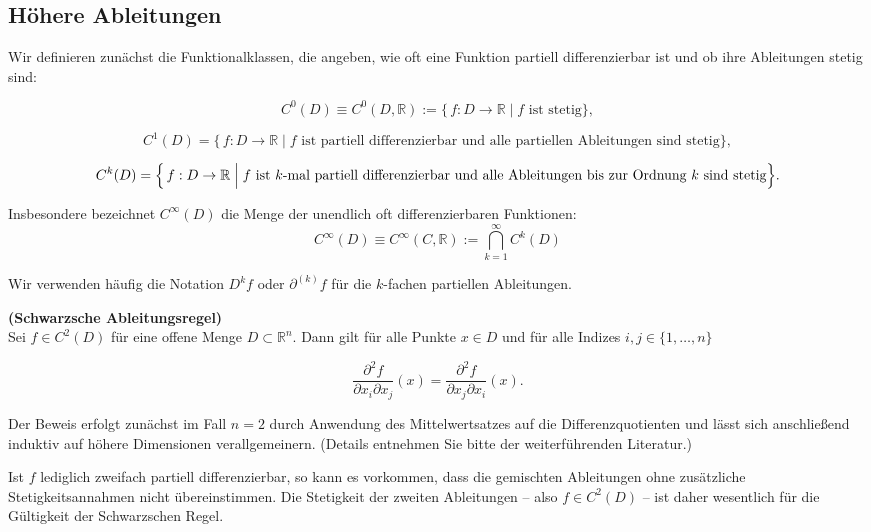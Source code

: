 \subsection{Höhere Ableitungen}

Wir definieren zunächst die Funktionalklassen, die angeben, wie oft eine Funktion partiell differenzierbar ist und ob ihre Ableitungen stetig sind:


$$
    C^0(D) \equiv C^0(D,  \mathbb{R}) := \{\,f: D\to\mathbb{R}\mid f \text{ ist stetig}\},
$$




$$
C^1(D)=\{\,f: D\to\mathbb{R}\mid f \text{ ist partiell differenzierbar und alle partiellen Ableitungen sind stetig}\},
$$




$$
C^k(D)=\Bigl\{\,f: D\to\mathbb{R}\;\Big|\; f \text{ ist } k\text{-mal partiell differenzierbar und alle Ableitungen bis zur Ordnung } k \text{ sind stetig}\Bigr\}.
$$


Insbesondere bezeichnet $C^\infty(D)$ die Menge der unendlich oft differenzierbaren Funktionen:
$$
    C^\infty(D) \equiv C^\infty(C,\mathbb{R}) := \bigcap_{k=1}^\infty C^k(D)
$$

\begin{bemerkungbox}
Wir verwenden häufig die Notation $D^k f$ oder $\partial^{(k)} f$ für die $k$-fachen partiellen Ableitungen.
\end{bemerkungbox}

\begin{satz}{}
\textbf{(Schwarzsche Ableitungsregel)}\\
Sei $f\in C^2(D)$ für eine offene Menge $D\subset \mathbb{R}^n$. Dann gilt für alle Punkte $x\in D$ und für alle Indizes $i,j\in\{1,\dots,n\}$ 


$$
\frac{\partial^2 f}{\partial x_i\partial x_j}(x)=\frac{\partial^2 f}{\partial x_j\partial x_i}(x).
$$


\end{satz}

\begin{beweisbox}
Der Beweis erfolgt zunächst im Fall $n=2$ durch Anwendung des Mittelwertsatzes auf die Differenzquotienten und lässt sich anschließend induktiv auf höhere Dimensionen verallgemeinern. (Details entnehmen Sie bitte der weiterführenden Literatur.)
\end{beweisbox}

\begin{bemerkungbox}
Ist $f$ lediglich zweifach partiell differenzierbar, so kann es vorkommen, dass die gemischten Ableitungen ohne zusätzliche Stetigkeitsannahmen nicht übereinstimmen. Die Stetigkeit der zweiten Ableitungen – also $f\in C^2(D)$ – ist daher wesentlich für die Gültigkeit der Schwarzschen Regel.
\end{bemerkungbox}

